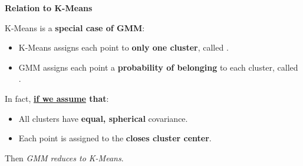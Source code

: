 \highspace
\begin{flushleft}
    \textcolor{Green3}{ \textbf{Relation to K-Means}}
\end{flushleft}
K-Means is a \textbf{special case of GMM}:
\begin{itemize}
    \item K-Means assigns each point to \textbf{only one cluster}, called .
    \item GMM assigns each point a \textbf{probability of belonging} to each cluster, called .
\end{itemize}
In fact, \textbf{\underline{if we assume} that}:
\begin{itemize}
    \item All clusters have \textbf{equal, spherical} covariance.
    \item Each point is assigned to the \textbf{closes cluster center}.
\end{itemize}
Then \emph{GMM reduces to K-Means}.

